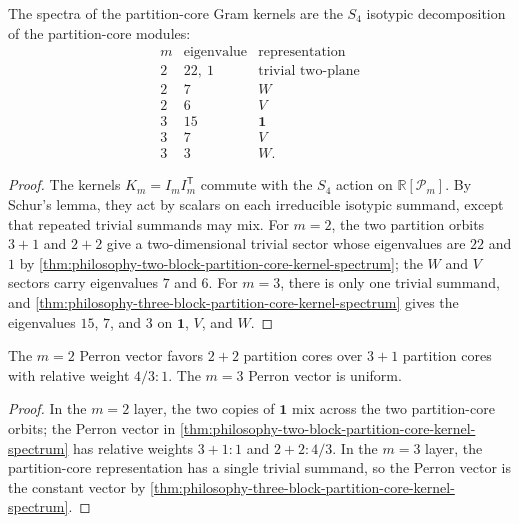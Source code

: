 \begin{theorem}
\label{thm:philosophy-partition-core-gram-representation-spectrum}
The spectra of the partition-core Gram kernels are the $S_{4}$ isotypic
decomposition of the partition-core modules:
$$
\begin{array}{c|c|c}
  m & \text{eigenvalue} & \text{representation}\\
  \hline
  2 & 22,\ 1 & \text{trivial two-plane}\\
  2 & 7 & W\\
  2 & 6 & V\\
  3 & 15 & \mathbf{1}\\
  3 & 7 & V\\
  3 & 3 & W.
\end{array}
$$
\end{theorem}
\begin{proof}
The kernels $K_{m}=I_{m}I_{m}^{\mathsf T}$ commute with the $S_{4}$ action
on $\mathbb{R}[\mathcal{P}_{m}]$. By Schur's lemma, they act by scalars on
each irreducible isotypic summand, except that repeated trivial summands
may mix. For $m=2$, the two partition orbits $3+1$ and $2+2$ give a
two-dimensional trivial sector whose eigenvalues are $22$ and $1$ by
\autoref{thm:philosophy-two-block-partition-core-kernel-spectrum}; the
$W$ and $V$ sectors carry eigenvalues $7$ and $6$. For $m=3$, there is
only one trivial summand, and
\autoref{thm:philosophy-three-block-partition-core-kernel-spectrum} gives
the eigenvalues $15$, $7$, and $3$ on $\mathbf{1}$, $V$, and $W$.
\end{proof}

\begin{corollary}
\label{cor:philosophy-partition-core-representation-balanced-bias}
The $m=2$ Perron vector favors $2+2$ partition cores over $3+1$ partition
cores with relative weight $4/3:1$. The $m=3$ Perron vector is uniform.
\end{corollary}
\begin{proof}
In the $m=2$ layer, the two copies of $\mathbf{1}$ mix across the two
partition-core orbits; the Perron vector in
\autoref{thm:philosophy-two-block-partition-core-kernel-spectrum} has
relative weights $3+1:1$ and $2+2:4/3$. In the $m=3$ layer, the
partition-core representation has a single trivial summand, so the Perron
vector is the constant vector by
\autoref{thm:philosophy-three-block-partition-core-kernel-spectrum}.
\end{proof}

